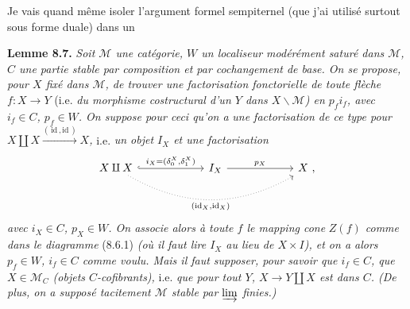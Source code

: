 Je vais quand même isoler l'argument formel sempiternel (que j'ai utilisé surtout sous forme duale) dans un

\textbf{Lemme 8.7.} \textit{Soit $\mathcal{M}$ une catégorie, $W$ un localiseur modérément saturé dans $\mathcal{M}$, $C$ une partie stable par composition et par cochangement de base. On se propose, pour $X$ fixé dans $\mathcal{M}$, de trouver une factorisation fonctorielle de toute flèche $f : X \longrightarrow Y$} (i.e. \textit{du morphisme costructural d'un $Y$ dans $X\backslash\mathcal{M}$) en $p_f i_f$, avec $i_f \in C$, $p_f \in W$. On suppose pour ceci qu'on a}
\textit{une factorisation de ce type pour $X \amalg X \xrightarrow{(\,\mathrm{id}\,,\mathrm{id}\,)} X$,} i.e. \textit{un objet $I_X$ et une factorisation}
\[
\begin{tikzcd}[column sep=6em]
X \amalg X \arrow[r, hook, "{i_X = (\delta_0^X,\delta_1^X)}"] \arrow[rr, dotted, bend right, "{(\mathrm{id}_X,\mathrm{id}_X)}"'] & I_X \arrow[r, "p_X"] & X\ ,
\end{tikzcd}
\]
\textit{avec $i_X \in C$, $p_X \in W$. On associe alors à toute $f$ le mapping cone} \textit{$Z(f)$ comme dans le diagramme} (8.6.1) \textit{(où il faut lire $I_X$ au lieu de $X \times I$), et on a alors $p_f \in W$, $i_f \in C$ comme voulu. Mais il faut supposer, pour savoir que $i_f \in C$, que $X \in \mathcal{M}_C$ (objets $C$-cofibrants),} i.e. \textit{que pour tout $Y$, $X \longrightarrow Y \amalg X$ est dans $C$. (De plus, on a supposé tacitement $\mathcal{M}$ stable par $\varinjlim$ finies.)}

